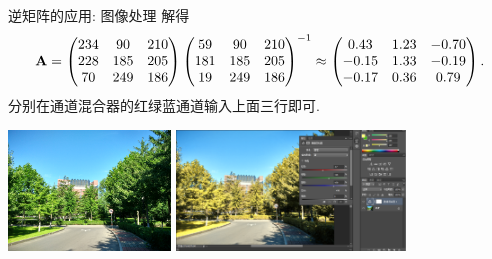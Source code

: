 \begin{frame}{逆矩阵的应用: 图像处理\noexer}
	\onslide<+->
	解得
	\[{\mathbf{A}}=\begin{pmatrix}
		234&90&210\\
		228&185&205\\
		70&249&186
	\end{pmatrix}\begin{pmatrix}
		59&90&210\\
		181&185&205\\
		19&249&186
	\end{pmatrix}^{-1}
	\approx\begin{pmatrix}
		0.43&1.23&-0.70\\
		-0.15&1.33&-0.19\\
		-0.17&0.36&0.79
	\end{pmatrix}.\]
	\onslide<+->
	分别在通道混合器的红绿蓝通道输入上面三行即可.
	\begin{center}
		\includegraphics[height=32mm]{../image/ps_in.jpg}
		\includegraphics[height=32mm]{../image/ps_out.png}
	\end{center}
\end{frame}



